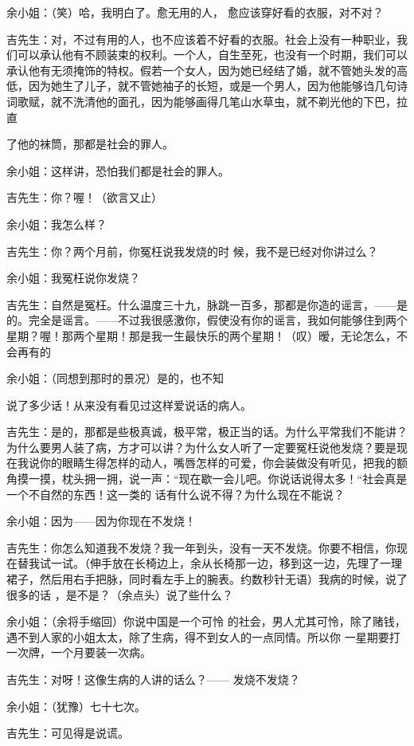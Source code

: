 \documentclass{article}
\begin{document}
余小姐：（笑）哈，我明白了。愈无用的人，
愈应该穿好看的衣服，对不对？ 

吉先生：对，不过有用的人，也不应该着不好看的衣服。社会上没有一种职业，我们可以承认他有不顾装束的权利。一个人，自生至死，也没有一个时期，我们可以承认他有无须掩饰的特权。假若一个女人，因为她已经结了婚，就不管她头发的高低，因为她生了儿子，就不管她袖子的长短，或是一个男人，因为他能够诌几句诗词歌赋，就不洗清他的面孔，因为能够画得几笔山水草虫，就不剃光他的下巴，拉直
\newpage

了他的袜筒，那都是社会的罪人。 

余小姐：这样讲，恐怕我们都是社会的罪人。


吉先生：你？喔！（欲言又止） 


余小姐：我怎么样？ 

吉先生：你？两个月前，你冤枉说我发烧的时
候，我不是已经对你讲过么？ 


余小姐：我冤枉说你发烧？ 

吉先生：自然是冤枉。什么温度三十九，脉跳一百多，那都是你造的谣言，——是的。完全是谣言。——不过我很感激你，假使没有你的谣言，我如何能够住到两个星期？喔！那两个星期！那是我一生最快乐的两个星期！（叹）暧，无论怎么，不会再有的

余小姐：（同想到那时的景况）是的，也不知

\newpage
说了多少话！从来没有看见过这样爱说话的病人。 

吉先生：是的，那都是些极真诚，极平常，极正当的话。为什么平常我们不能讲？为什么要男人装了病，方才可以讲？为什么女人听了一定要冤枉说他发烧？要是现在我说你的眼睛生得怎样的动人，嘴唇怎样的可爱，你会装做没有听见，把我的额角摸一摸，枕头拥一拥，说一声：“现在歇一会儿吧。你说话说得太多！“社会真是一个不自然的东西！这一类的
话有什么说不得？为什么现在不能说？ 


余小姐：因为——因为你现在不发烧！ 

吉先生：你怎么知道我不发烧？我一年到头，没有一天不发烧。你要不相信，你现在替我试一试。（伸手放在长椅边上，余从长椅那一边，移到这一边，先理了一理裙子，然后用右手把脉，同时看左手上的腕表。约数秒针无语）我病的时候，说了很多的话
，是不是？（余点头）说了些什么？ 


余小姐：（余将手缩回）你说中国是一个可怜
\newpage
的社会，男人尤其可怜，除了赌钱，遇不到人家的小姐太太，除了生病，得不到女人的一点同情。所以你
一星期要打一次牌，一个月要装一次病。 

吉先生：对呀！这像生病的人讲的话么？——
发烧不发烧？ 


余小姐：（犹豫）七十七次。 


吉先生：可见得是说谎。 
\end{document}
